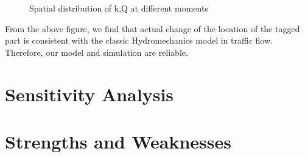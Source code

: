 \documentclass{mcmthesis}
\begin{document}
\begin{figure}[H]
\centering
{}
 \caption{Spatial distribution of k,Q at different moments} \label{fig:1}
\end{figure}
\indent From the above figure, we find that actual change of the location of the tagged part is consistent with the classic Hydromechanics model in traffic flow. \\
\indent Therefore, our model and simulation are reliable.




\indent \section{Sensitivity Analysis}

\section{Strengths and Weaknesses}
\end{document}
